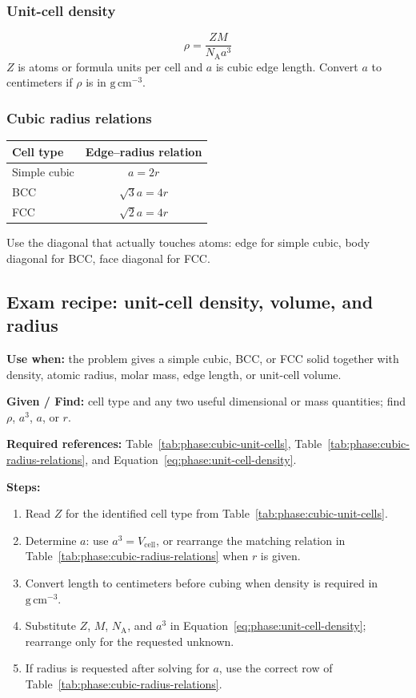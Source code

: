 \subsubsection{Unit-cell density}
\begin{equation}
\label{eq:phase:unit-cell-density}
\rho=\frac{ZM}{N_{\mathrm A}a^3}
\end{equation}
\(Z\) is atoms or formula units per cell and \(a\) is cubic edge length. Convert \(a\) to centimeters if \(\rho\) is in \(\mathrm{g\,cm^{-3}}\).

\subsubsection{Cubic radius relations}
\begin{tabular}{@{}lc@{}}
\toprule
Cell type & Edge--radius relation\\
\midrule
Simple cubic & \(a=2r\)\\
BCC & \(\sqrt{3}a=4r\)\\
FCC & \(\sqrt{2}a=4r\)\\
\bottomrule
\end{tabular}
Use the diagonal that actually touches atoms: edge for simple cubic, body diagonal for BCC, face diagonal for FCC.

\subsection{Exam recipe: unit-cell density, volume, and radius}
\textbf{Use when:} the problem gives a simple cubic, BCC, or FCC solid together with density, atomic radius, molar mass, edge length, or unit-cell volume.

\textbf{Given / Find:} cell type and any two useful dimensional or mass quantities; find \(\rho\), \(a^3\), \(a\), or \(r\).

\textbf{Required references:} Table~\ref{tab:phase:cubic-unit-cells}, Table~\ref{tab:phase:cubic-radius-relations}, and Equation~\ref{eq:phase:unit-cell-density}.


\textbf{Steps:}
\begin{enumerate}
    \item Read \(Z\) for the identified cell type from Table~\ref{tab:phase:cubic-unit-cells}.
    \item Determine \(a\): use \(a^3=V_{\mathrm{cell}}\), or rearrange the matching relation in Table~\ref{tab:phase:cubic-radius-relations} when \(r\) is given.
    \item Convert length to centimeters before cubing when density is required in \(\mathrm{g\,cm^{-3}}\).
    \item Substitute \(Z\), \(M\), \(N_{\mathrm A}\), and \(a^3\) in Equation~\ref{eq:phase:unit-cell-density}; rearrange only for the requested unknown.
    \item If radius is requested after solving for \(a\), use the correct row of Table~\ref{tab:phase:cubic-radius-relations}.
\end{enumerate}

